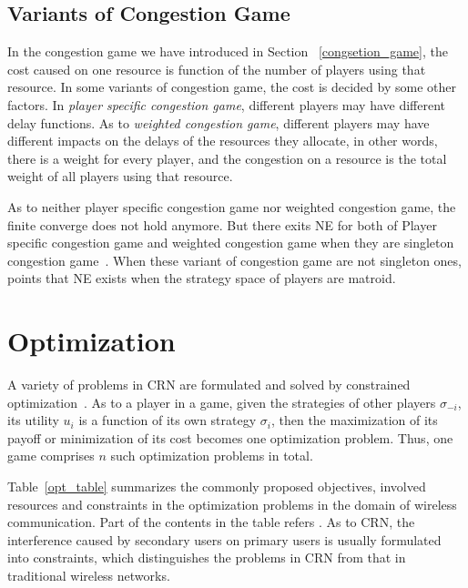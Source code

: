 \subsection{Variants of Congestion Game}
In the congestion game we have introduced in Section ~\ref{congsetion_game}, the cost caused on one resource is function of the number of players using that resource.
In some variants of congestion game, the cost is decided by some other factors.
In \textit{player specific congestion game}, different players may have different delay functions.
As to \textit{weighted congestion game}, different players may have different impacts on the delays of the resources they allocate, in other words, there is a weight for every player, and the congestion on a resource is the total weight of all players using that resource.

As to neither player specific congestion game nor weighted congestion game, the finite converge does not hold anymore.
But there exits NE for both of Player specific congestion game and weighted congestion game when they are singleton congestion game~\cite{Milchtaich1996111, FKKMS02}.
When these variant of congestion game are not singleton ones, \cite{Ackermann06purenash} points that NE exists when the strategy space of players are matroid.








\section{Optimization}

A variety of problems in CRN are formulated and solved by constrained optimization~\cite{cacao_ca_2011, fuzzy_decision_09, resourceAllocation_imperfectSensing_2012}.
As to a player in a game, given the strategies of other players $\sigma_{-i}$, its utility $u_i$ is a function of its own strategy $\sigma_i$, then the maximization of its payoff or minimization of its cost becomes one optimization problem.
Thus, one game comprises $n$ such optimization problems in total.

Table~\ref{opt_table} summarizes the commonly proposed objectives, involved resources and constraints in the optimization problems in the domain of wireless communication.
Part of the contents in the table refers \cite{Han:2008:RAW:1457343}.
As to CRN, the interference caused by secondary users on primary users is usually formulated into constraints, which distinguishes the problems in CRN from that in traditional wireless networks. 

